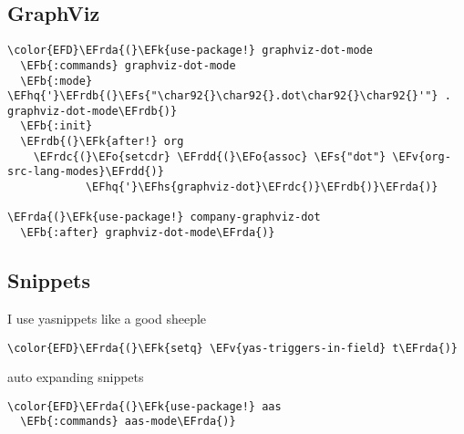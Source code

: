 \documentclass{article}
\newcommand{\EFs}[1]{\textcolor{EFs}{#1}} %
\newcommand{\EFk}[1]{\textcolor{EFk}{#1}} %
\newcommand{\EFb}[1]{\textcolor{EFb}{#1}} %
\newcommand{\EFv}[1]{\textcolor{EFv}{#1}} %
\newcommand{\EFo}[1]{\textcolor{EFo}{#1}} %
\newcommand{\EFhq}[1]{#1} %
\newcommand{\EFhs}[1]{\textcolor{EFhs}{#1}} %
\newcommand{\EFrda}[1]{\textcolor{EFrda}{#1}} %
\newcommand{\EFrdb}[1]{\textcolor{EFrdb}{#1}} %
\newcommand{\EFrdc}[1]{\textcolor{EFrdc}{#1}} %
\newcommand{\EFrdd}[1]{\textcolor{EFrdd}{#1}} %
\begin{document}
\subsection{GraphViz}
\label{sec:org8fd7046}
\begin{Code}
\begin{Verbatim}
\color{EFD}\EFrda{(}\EFk{use-package!} graphviz-dot-mode
  \EFb{:commands} graphviz-dot-mode
  \EFb{:mode} \EFhq{'}\EFrdb{(}\EFs{"\char92{}\char92{}.dot\char92{}\char92{}'"} . graphviz-dot-mode\EFrdb{)}
  \EFb{:init}
  \EFrdb{(}\EFk{after!} org
    \EFrdc{(}\EFo{setcdr} \EFrdd{(}\EFo{assoc} \EFs{"dot"} \EFv{org-src-lang-modes}\EFrdd{)}
            \EFhq{'}\EFhs{graphviz-dot}\EFrdc{)}\EFrdb{)}\EFrda{)}

\EFrda{(}\EFk{use-package!} company-graphviz-dot
  \EFb{:after} graphviz-dot-mode\EFrda{)}
\end{Verbatim}
\end{Code}

\subsection{Snippets}
\label{sec:org7e5a30b}
I use yasnippets like a good sheeple
\begin{Code}
\begin{Verbatim}
\color{EFD}\EFrda{(}\EFk{setq} \EFv{yas-triggers-in-field} t\EFrda{)}
\end{Verbatim}
\end{Code}
auto expanding snippets
\begin{Code}
\begin{Verbatim}
\color{EFD}\EFrda{(}\EFk{use-package!} aas
  \EFb{:commands} aas-mode\EFrda{)}
\end{Verbatim}
\end{Code}
\end{document}
